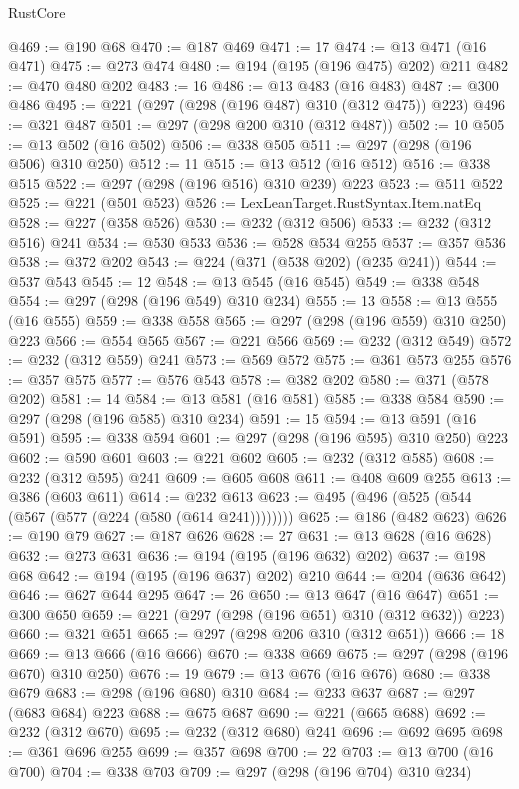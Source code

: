 \begin{lexlean}{RustCore}
\begin{coremodule}
@469 := @190 @68
@470 := @187 @469
@471 := 17
@474 := @13 @471 (@16 @471)
@475 := @273 @474
@480 := @194 (@195 (@196 @475) @202) @211
@482 := @470 @480 @202
@483 := 16
@486 := @13 @483 (@16 @483)
@487 := @300 @486
@495 := @221 (@297 (@298 (@196 @487) @310 (@312 @475)) @223)
@496 := @321 @487
@501 := @297 (@298 @200 @310 (@312 @487))
@502 := 10
@505 := @13 @502 (@16 @502)
@506 := @338 @505
@511 := @297 (@298 (@196 @506) @310 @250)
@512 := 11
@515 := @13 @512 (@16 @512)
@516 := @338 @515
@522 := @297 (@298 (@196 @516) @310 @239) @223
@523 := @511 @522
@525 := @221 (@501 @523)
@526 := LexLeanTarget.RustSyntax.Item.natEq
@528 := @227 (@358 @526)
@530 := @232 (@312 @506)
@533 := @232 (@312 @516) @241
@534 := @530 @533
@536 := @528 @534 @255
@537 := @357 @536
@538 := @372 @202
@543 := @224 (@371 (@538 @202) (@235 @241))
@544 := @537 @543
@545 := 12
@548 := @13 @545 (@16 @545)
@549 := @338 @548
@554 := @297 (@298 (@196 @549) @310 @234)
@555 := 13
@558 := @13 @555 (@16 @555)
@559 := @338 @558
@565 := @297 (@298 (@196 @559) @310 @250) @223
@566 := @554 @565
@567 := @221 @566
@569 := @232 (@312 @549)
@572 := @232 (@312 @559) @241
@573 := @569 @572
@575 := @361 @573 @255
@576 := @357 @575
@577 := @576 @543
@578 := @382 @202
@580 := @371 (@578 @202)
@581 := 14
@584 := @13 @581 (@16 @581)
@585 := @338 @584
@590 := @297 (@298 (@196 @585) @310 @234)
@591 := 15
@594 := @13 @591 (@16 @591)
@595 := @338 @594
@601 := @297 (@298 (@196 @595) @310 @250) @223
@602 := @590 @601
@603 := @221 @602
@605 := @232 (@312 @585)
@608 := @232 (@312 @595) @241
@609 := @605 @608
@611 := @408 @609 @255
@613 := @386 (@603 @611)
@614 := @232 @613
@623 := @495 (@496 (@525 (@544 (@567 (@577 (@224 (@580 (@614 @241))))))))
@625 := @186 (@482 @623)
@626 := @190 @79
@627 := @187 @626
@628 := 27
@631 := @13 @628 (@16 @628)
@632 := @273 @631
@636 := @194 (@195 (@196 @632) @202)
@637 := @198 @68
@642 := @194 (@195 (@196 @637) @202) @210
@644 := @204 (@636 @642)
@646 := @627 @644 @295
@647 := 26
@650 := @13 @647 (@16 @647)
@651 := @300 @650
@659 := @221 (@297 (@298 (@196 @651) @310 (@312 @632)) @223)
@660 := @321 @651
@665 := @297 (@298 @206 @310 (@312 @651))
@666 := 18
@669 := @13 @666 (@16 @666)
@670 := @338 @669
@675 := @297 (@298 (@196 @670) @310 @250)
@676 := 19
@679 := @13 @676 (@16 @676)
@680 := @338 @679
@683 := @298 (@196 @680) @310
@684 := @233 @637
@687 := @297 (@683 @684) @223
@688 := @675 @687
@690 := @221 (@665 @688)
@692 := @232 (@312 @670)
@695 := @232 (@312 @680) @241
@696 := @692 @695
@698 := @361 @696 @255
@699 := @357 @698
@700 := 22
@703 := @13 @700 (@16 @700)
@704 := @338 @703
@709 := @297 (@298 (@196 @704) @310 @234)

\end{coremodule}
\end{lexlean}
